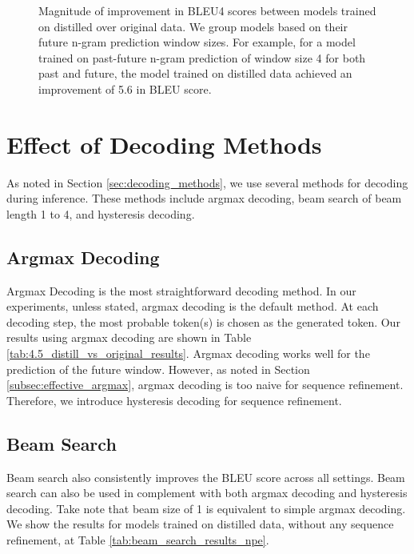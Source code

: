 \begin{figure}
\centering
{}
\caption{Magnitude of improvement in BLEU4 scores between models trained on distilled over original data. We group models based on their future n-gram prediction window sizes. For example, for a model trained on past-future n-gram prediction of window size 4 for both past and future, the model trained on distilled data achieved an improvement of 5.6 in BLEU score.}
\label{fig:difference_bleu_distill_original}
\end{figure}



\section{Effect of Decoding Methods} 
As noted in Section \ref{sec:decoding_methods}, we use several methods for decoding during inference. These methods include argmax decoding, beam search of beam length 1 to 4, and hysteresis decoding.

\subsection{Argmax Decoding}
Argmax Decoding is the most straightforward decoding method. In our experiments, unless stated, argmax decoding is the default method. At each decoding step, the most probable token(s) is chosen as the generated token. Our results using argmax decoding are shown in Table \ref{tab:4.5_distill_vs_original_results}. Argmax decoding works well for the prediction of the future window. However, as noted in Section \ref{subsec:effective_argmax}, argmax decoding is too naive for sequence refinement. Therefore, we introduce hysteresis decoding for sequence refinement.

\subsection{Beam Search}
Beam search also consistently improves the BLEU score across all settings. Beam search can also be used in complement with both argmax decoding and hysteresis decoding. Take note that beam size of 1 is equivalent to simple argmax decoding. We show the results for models trained on distilled data, without any sequence refinement, at Table \ref{tab:beam_search_results_npe}. 

